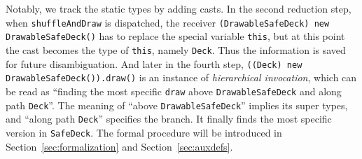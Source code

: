 Notably, we track the static types by adding casts. In the second reduction step, when 
\lstinline|shuffleAndDraw| is dispatched, the receiver \lstinline|(DrawableSafeDeck) new DrawableSafeDeck()|
has to replace the special variable \lstinline|this|, but at this point the cast becomes the type of \lstinline|this|,
namely \lstinline|Deck|. Thus the information is saved for future disambiguation. And later in the fourth step,
\lstinline|((Deck) new DrawableSafeDeck()).draw()|
is an instance of \textit{hierarchical invocation}, which can be read as 
``finding the most specific \lstinline|draw| above \lstinline|DrawableSafeDeck| and along path \lstinline|Deck|''. The meaning of ``above \lstinline|DrawableSafeDeck|'' implies its super types, and ``along path
\lstinline|Deck|'' specifies the branch. It finally finds the most specific version in \lstinline|SafeDeck|.
The formal procedure will be introduced in Section~\ref{sec:formalization} and Section~\ref{sec:auxdefs}.

